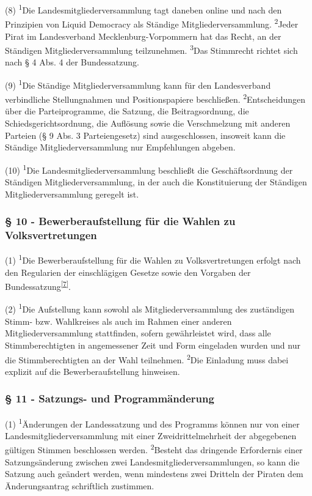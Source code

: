 (8) \textsuperscript{1}Die Landesmitgliederversammlung tagt daneben
online und nach den Prinzipien von Liquid Democracy als Ständige
Mitgliederversammlung. \textsuperscript{2}Jeder Pirat im Landesverband
Mecklenburg-Vorpommern hat das Recht, an der Ständigen
Mitgliederversammlung teilzunehmen. \textsuperscript{3}Das Stimmrecht
richtet sich nach § 4 Abs. 4 der Bundessatzung.

(9) \textsuperscript{1}Die Ständige Mitgliederversammlung kann für den
Landesverband verbindliche Stellungnahmen und Positionspapiere
beschließen. \textsuperscript{2}Entscheidungen über die Parteiprogramme,
die Satzung, die Beitragsordnung, die Schiedsgerichtsordnung, die
Auflösung sowie die Verschmelzung mit anderen Parteien (§ 9 Abs. 3
Parteiengesetz) sind ausgeschlossen, insoweit kann die Ständige
Mitgliederversammlung nur Empfehlungen abgeben.

(10) \textsuperscript{1}Die Landesmitgliederversammlung beschließt die
Geschäftsordnung der Ständigen Mitgliederversammlung, in der auch die
Konstituierung der Ständigen Mitgliederversammlung geregelt ist.

\subsubsection{§ 10 - Bewerberaufstellung für die Wahlen zu
Volksvertretungen}

(1) \textsuperscript{1}Die Bewerberaufstellung für die Wahlen zu
Volksvertretungen erfolgt nach den Regularien der einschlägigen Gesetze
sowie den Vorgaben der
Bundessatzung\textsuperscript{\href{\#cite\_note-6}{{[}7{]}}}.

(2) \textsuperscript{1}Die Aufstellung kann sowohl als
Mitgliederversammlung des zuständigen Stimm- bzw. Wahlkreises als auch
im Rahmen einer anderen Mitgliederversammlung stattfinden, sofern
gewährleistet wird, dass alle Stimmberechtigten in angemessener Zeit und
Form eingeladen wurden und nur die Stimmberechtigten an der Wahl
teilnehmen. \textsuperscript{2}Die Einladung muss dabei explizit auf die
Bewerberaufstellung hinweisen.

\subsubsection{§ 11 - Satzungs- und Programmänderung}

(1) \textsuperscript{1}Änderungen der Landessatzung und des Programms
können nur von einer Landesmitgliederversammlung mit einer
Zweidrittelmehrheit der abgegebenen gültigen Stimmen beschlossen werden.
\textsuperscript{2}Besteht das dringende Erfordernis einer
Satzungsänderung zwischen zwei Landesmitgliederversammlungen, so kann
die Satzung auch geändert werden, wenn mindestens zwei Dritteln der
Piraten dem Änderungsantrag schriftlich zustimmen.

